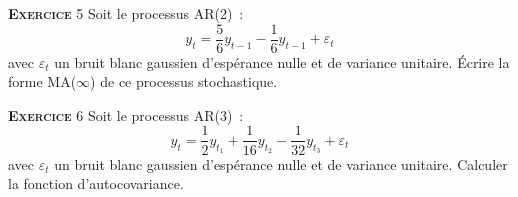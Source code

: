 \documentclass[10pt,a4paper,notitlepage]{article}
\newcommand{\exercice}[1]{\textsc{\textbf{Exercice}} #1}
\begin{document}
\bigskip

\exercice{5} Soit le processus AR(2) :
\[
y_t = \frac{5}{6}y_{t-1} - \frac{1}{6}y_{t-1} + \varepsilon_t
\]
avec ${\varepsilon_t}$ un bruit blanc gaussien d'espérance nulle et de variance unitaire. Écrire la forme MA($\infty$) de ce processus stochastique.

\exercice{6} Soit le processus AR(3) :
\[
y_t = \frac{1}{2}y_{t_1} + \frac{1}{16}y_{t_2} - \frac{1}{32}y_{t_3} + \varepsilon_t
\]
avec ${\varepsilon_t}$ un bruit blanc gaussien d'espérance nulle et de variance unitaire. Calculer la fonction d'autocovariance.
\end{document}
